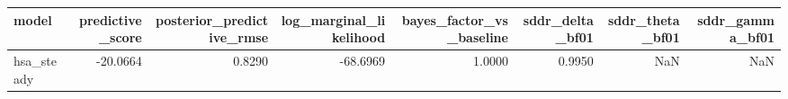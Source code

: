 \begin{tabular}{lrrrrrrr}
\toprule
model & predictive\_score & posterior\_predictive\_rmse & log\_marginal\_likelihood & bayes\_factor\_vs\_baseline & sddr\_delta\_bf01 & sddr\_theta\_bf01 & sddr\_gamma\_bf01 \\
\midrule
hsa\_steady & -20.0664 & 0.8290 & -68.6969 & 1.0000 & 0.9950 & NaN & NaN \\
\bottomrule
\end{tabular}
